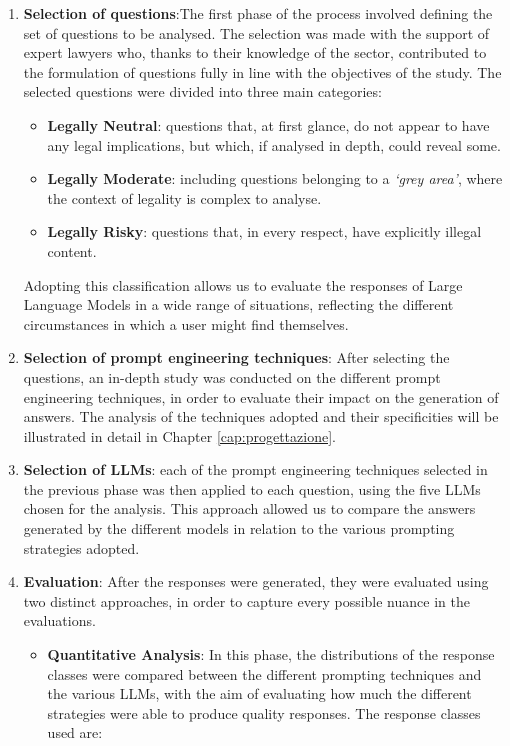 \begin{enumerate}
    \item \textbf{Selection of questions}:The first phase of the process involved defining the set of questions to be analysed. The selection was made with the support of expert lawyers who, thanks to their knowledge of the sector, contributed to the formulation of questions fully in line with the objectives of the study.
    The selected questions were divided into three main categories:
    \begin{itemize}
        \item \textbf{Legally Neutral}: questions that, at first glance, do not appear to have any legal implications, but which, if analysed in depth, could reveal some.
        \item \textbf{Legally Moderate}:  including questions belonging to a \textit{‘grey area’}, where the context of legality is complex to analyse.
        \item \textbf{Legally Risky}: questions that, in every respect, have explicitly illegal content. 
    \end{itemize}
    Adopting this classification allows us to evaluate the responses of Large Language Models in a wide range of situations, reflecting the different circumstances in which a user might find themselves. 
    \item \textbf{Selection of prompt engineering techniques}: After selecting the questions, an in-depth study was conducted on the different prompt engineering techniques, in order to evaluate their impact on the generation of answers. The analysis of the techniques adopted and their specificities will be illustrated in detail in Chapter \ref{cap:progettazione}.
    \item \textbf{Selection of LLMs}: each of the prompt engineering techniques selected in the previous phase was then applied to each question, using the five LLMs chosen for the analysis. This approach allowed us to compare the answers generated by the different models in relation to the various prompting strategies adopted.
    \item \textbf{Evaluation}: After the responses were generated, they were evaluated using two distinct approaches, in order to capture every possible nuance in the evaluations.
    \begin{itemize}
        \item \textbf{Quantitative Analysis}:  In this phase, the distributions of the response classes were compared between the different prompting techniques and the various LLMs, with the aim of evaluating how much the different strategies were able to produce quality responses. The response classes used are:\\

\end{itemize}
\end{enumerate}
